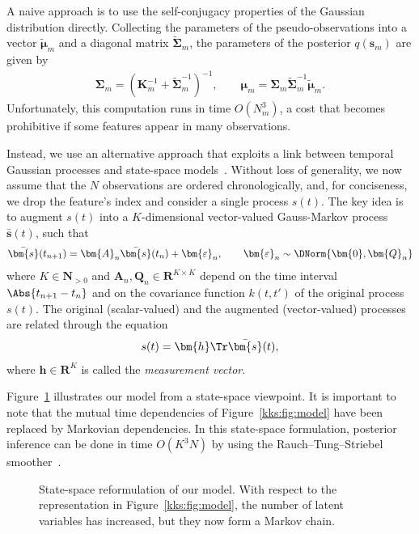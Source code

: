 A naive approach is to use the self-conjugacy properties of the Gaussian distribution directly.
Collecting the parameters of the pseudo-observations into a vector $\tilde{\bm{\mu}}_m$ and a diagonal matrix $\tilde{\bm{\Sigma}}_m$, the parameters of the posterior $q(\bm{s}_m)$ are given by
\begin{align}
	\label{kks:eq:batch}
	\bm{\Sigma}_m = (\bm{K}_m^{-1} + \tilde{\bm{\Sigma}}_m^{-1})^{-1}, \qquad
	\bm{\mu}_m    = \bm{\Sigma}_m \tilde{\bm{\Sigma}}_m^{-1} \tilde{\bm{\mu}}_m.
\end{align}
Unfortunately, this computation runs in time $O(N_m^3)$, a cost that becomes prohibitive if some features appear in many observations.

Instead, we use an alternative approach that exploits a link between temporal Gaussian processes and state-space models~\citep{hartikainen2010kalman, reece2010introduction}.
Without loss of generality, we now assume that the $N$ observations are ordered chronologically, and, for conciseness, we drop the feature's index and consider a single process $s(t)$.
The key idea is to augment $s(t)$ into a $K$-dimensional vector-valued Gauss-Markov process $\bar{\bm{s}}(t)$, such that
\begin{align*}
	\bar{\bm{s}}(t_{n+1}) = \bm{A}_n \bar{\bm{s}}(t_n) + \bm{\varepsilon}_n,
	\qquad \bm{\varepsilon}_n \sim \DNorm{\bm{0}, \bm{Q}_n}
\end{align*}
where $K \in \mathbf{N}_{>0}$ and $\bm{A}_n, \bm{Q}_n \in \mathbf{R}^{K \times K}$ depend on the time interval $\Abs{t_{n+1} - t_n}$ and on the covariance function $k(t, t')$ of the original process $s(t)$.
The original (scalar-valued) and the augmented (vector-valued) processes are related through the equation
\begin{align*}
	s(t) = \bm{h}\Tr \bar{\bm{s}}(t),
\end{align*}
where $\bm{h} \in \mathbf{R}^K$ is called the \emph{measurement vector}.

Figure~\ref{kks:fig:ssm} illustrates our model from a state-space viewpoint.
It is important to note that the mutual time dependencies of Figure~\ref{kks:fig:model} have been replaced by Markovian dependencies.
In this state-space formulation, posterior inference can be done in time $O(K^3 N)$ by using the Rauch--Tung--Striebel smoother~\citep{sarkka2013bayesian}.

\begin{figure}[t]
	\centering
	
	\caption{State-space reformulation of our model.
		With respect to the representation in Figure~\ref{kks:fig:model}, the number of latent variables has increased, but they now form a Markov chain.}
	\label{kks:fig:ssm}
\end{figure}

